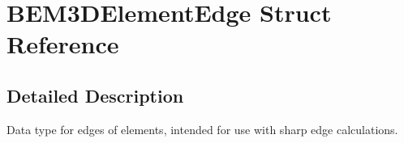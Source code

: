 \section{BEM3DElementEdge Struct Reference}
\label{structBEM3DElementEdge}


\subsection{Detailed Description}
Data type for edges of elements, intended for use with sharp edge calculations. 